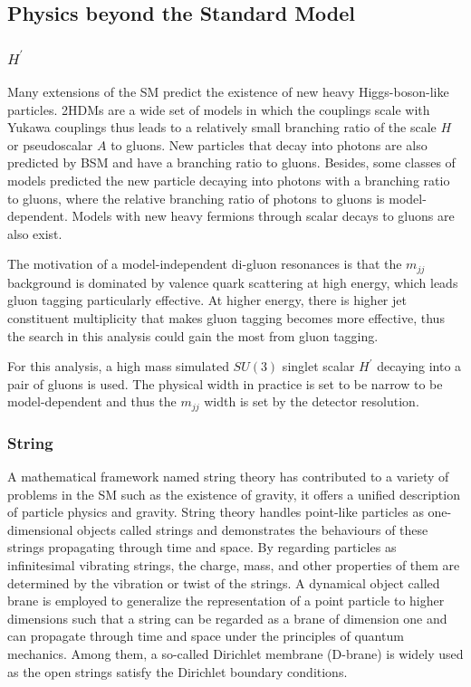 \documentclass[UTF8,12pt]{ctexart}
\numberwithin{equation}{section}
\def\mjj{$m_{jj}$ }
\begin{document}
\subsection{Physics beyond the Standard Model}
\label{sec:2.2}
\subsubsection{$H^\prime$}

Many extensions of the SM predict the existence of new heavy Higgs-boson-like particles. 2HDMs are a wide set of models in which the couplings scale with Yukawa couplings thus leads to a relatively small branching ratio of the scale $H$ or pseudoscalar $A$ to gluons. New particles that decay into photons are also predicted by BSM and have a branching ratio to gluons.  Besides, some classes of models predicted the new particle decaying into photons with a branching ratio to gluons, where the relative branching ratio of photons to gluons is model-dependent. Models with new heavy fermions through scalar decays to gluons are also exist.

The motivation of a model-independent di-gluon resonances is that the \mjj background is dominated by valence quark scattering at high energy, which leads gluon tagging particularly effective. At higher energy, there is higher jet constituent multiplicity that makes gluon tagging becomes more effective, thus the search in this analysis could gain the most from gluon tagging.

For this analysis, a high mass simulated $SU(3)$ singlet scalar $H^\prime$ decaying into a pair of gluons is used. The physical width in practice is set to be narrow to be model-dependent and thus the \mjj width is set by the detector resolution.

\subsubsection{String}


A mathematical framework named string theory has contributed to a variety of problems in the SM such as the existence of gravity, it offers a unified description of particle physics and gravity. String theory handles point-like particles as one-dimensional objects called strings and demonstrates the behaviours of these strings propagating through time and space. By regarding particles as infinitesimal vibrating strings, the charge, mass, and other properties of them are determined by the vibration or twist of the strings. A dynamical object called brane is employed to generalize the representation of a point particle to higher dimensions such that a string can be regarded as a brane of dimension one and can propagate through time and space under the principles of quantum mechanics. Among them, a so-called Dirichlet membrane (D-brane) is widely used as the open strings satisfy the Dirichlet boundary conditions.
\end{document}
